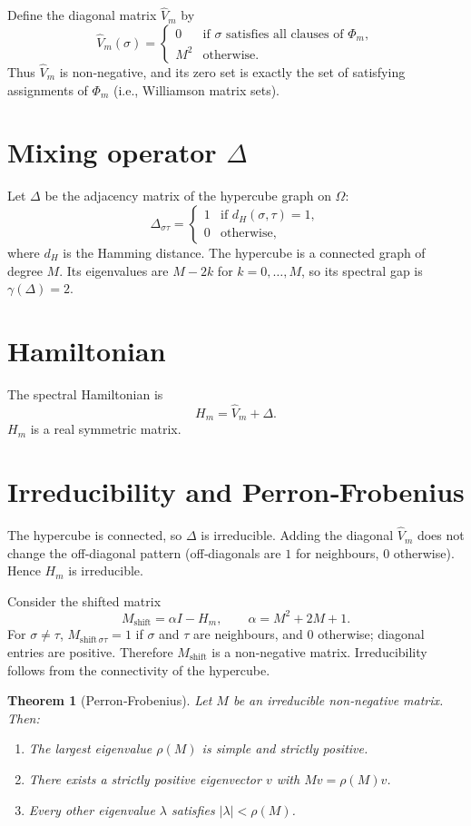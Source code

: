 \documentclass[11pt,a4paper]{article}
\newtheorem{theorem}{Theorem}[section]
\begin{document}
Define the diagonal matrix $\hat{V}_m$ by
\[
\hat{V}_m(\sigma) = \begin{cases}
0 & \text{if }\sigma\text{ satisfies all clauses of } \Phi_m,\\
M^2 & \text{otherwise}.
\end{cases}
\]
Thus $\hat{V}_m$ is non‑negative, and its zero set is exactly the set of satisfying assignments of $\Phi_m$ (i.e., Williamson matrix sets).

\section{Mixing operator $\Delta$}

Let $\Delta$ be the adjacency matrix of the hypercube graph on $\Omega$:
\[
\Delta_{\sigma\tau} = \begin{cases}
1 & \text{if } d_H(\sigma,\tau)=1,\\
0 & \text{otherwise},
\end{cases}
\]
where $d_H$ is the Hamming distance. The hypercube is a connected graph of degree $M$. Its eigenvalues are $M-2k$ for $k=0,\dots,M$, so its spectral gap is $\gamma(\Delta)=2$.

\section{Hamiltonian}

The spectral Hamiltonian is
\[
H_m = \hat{V}_m + \Delta.
\]
$H_m$ is a real symmetric matrix.

\section{Irreducibility and Perron‑Frobenius}

The hypercube is connected, so $\Delta$ is irreducible. Adding the diagonal $\hat{V}_m$ does not change the off‑diagonal pattern (off‑diagonals are $1$ for neighbours, $0$ otherwise). Hence $H_m$ is irreducible.

Consider the shifted matrix
\[
M_{\text{shift}} = \alpha I - H_m,\qquad \alpha = M^2 + 2M + 1.
\]
For $\sigma\neq\tau$, $M_{\text{shift}\,\sigma\tau} = 1$ if $\sigma$ and $\tau$ are neighbours, and $0$ otherwise; diagonal entries are positive. Therefore $M_{\text{shift}}$ is a non‑negative matrix. Irreducibility follows from the connectivity of the hypercube.

\begin{theorem}[Perron‑Frobenius]
Let $M$ be an irreducible non‑negative matrix. Then:
\begin{enumerate}
\item The largest eigenvalue $\rho(M)$ is simple and strictly positive.
\item There exists a strictly positive eigenvector $v$ with $Mv = \rho(M)v$.
\item Every other eigenvalue $\lambda$ satisfies $|\lambda| < \rho(M)$.
\end{enumerate}
\end{theorem}
\end{document}
